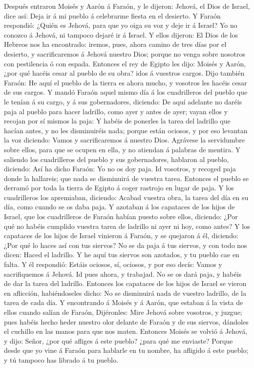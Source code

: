  Después entraron Moisés y Aarón á Faraón, y le dijeron:
Jehová, el Dios de Israel, dice así: Deja ir á mi pueblo á celebrarme
fiesta en el desierto.  Y Faraón respondió: ¿Quién es
Jehová, para que yo oiga su voz y deje ir á Israel? Yo no conozco á
Jehová, ni tampoco dejaré ir á Israel.  Y ellos dijeron: El
Dios de los Hebreos nos ha encontrado: iremos, pues, ahora camino de
tres días por el desierto, y sacrificaremos á Jehová nuestro Dios;
porque no venga sobre nosotros con pestilencia ó con espada.
 Entonces el rey de Egipto les dijo: Moisés y Aarón, ¿por
qué hacéis cesar al pueblo de su obra? idos á vuestros cargos.
 Dijo también Faraón: He aquí el pueblo de la tierra es
ahora mucho, y vosotros les hacéis cesar de sus cargos.  Y
mandó Faraón aquel mismo día á los cuadrilleros del pueblo que le tenían
á su cargo, y á sus gobernadores, diciendo:  De aquí
adelante no daréis paja al pueblo para hacer ladrillo, como ayer y antes
de ayer; vayan ellos y recojan por sí mismos la paja:  Y
habéis de ponerles la tarea del ladrillo que hacían antes, y no les
disminuiréis nada; porque están ociosos, y por eso levantan la voz
diciendo: Vamos y sacrificaremos á nuestro Dios.  Agrávese
la servidumbre sobre ellos, para que se ocupen en ella, y no atiendan á
palabras de mentira.  Y saliendo los cuadrilleros del
pueblo y sus gobernadores, hablaron al pueblo, diciendo: Así ha dicho
Faraón: Yo no os doy paja.  Id vosotros, y recoged paja
donde la hallareis; que nada se disminuirá de vuestra tarea.
 Entonces el pueblo se derramó por toda la tierra de Egipto
á coger rastrojo en lugar de paja.  Y los cuadrilleros los
apremiaban, diciendo: Acabad vuestra obra, la tarea del día en su día,
como cuando se os daba paja.  Y azotaban á los capataces de
los hijos de Israel, que los cuadrilleros de Faraón habían puesto sobre
ellos, diciendo: ¿Por qué no habéis cumplido vuestra tarea de ladrillo
ni ayer ni hoy, como antes?  Y los capataces de los hijos
de Israel vinieron á Faraón, y se quejaron á él, diciendo: ¿Por qué lo
haces así con tus siervos?  No se da paja á tus siervos, y
con todo nos dicen: Haced el ladrillo. Y he aquí tus siervos son
azotados, y tu pueblo cae en falta.  Y él respondió: Estáis
ociosos, sí, ociosos, y por eso decís: Vamos y sacrifiquemos á Jehová.
 Id pues ahora, y trabajad. No se os dará paja, y habéis de
dar la tarea del ladrillo.  Entonces los capataces de los
hijos de Israel se vieron en aflicción, habiéndoseles dicho: No se
disminuirá nada de vuestro ladrillo, de la tarea de cada día.
 Y encontrando á Moisés y á Aarón, que estaban á la vista
de ellos cuando salían de Faraón,  Dijéronles: Mire Jehová
sobre vosotros, y juzgue; pues habéis hecho heder nuestro olor delante
de Faraón y de sus siervos, dándoles el cuchillo en las manos para que
nos maten.  Entonces Moisés se volvió á Jehová, y dijo:
Señor, ¿por qué afliges á este pueblo? ¿para qué me enviaste?
 Porque desde que yo vine á Faraón para hablarle en tu
nombre, ha afligido á este pueblo; y tú tampoco has librado á tu pueblo.


